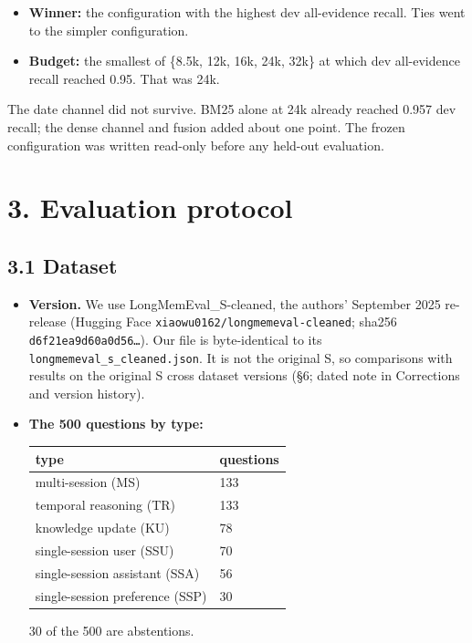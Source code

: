 \documentclass[11pt]{article}
\providecommand{\tightlist}{\setlength{\itemsep}{0pt}\setlength{\parskip}{0pt}}
\begin{document}
\begin{itemize}
\tightlist
\item
  \textbf{Winner:} the configuration with the highest dev all-evidence recall. Ties went to the simpler
  configuration.
\item
  \textbf{Budget:} the smallest of \{8.5k, 12k, 16k, 24k, 32k\} at which dev all-evidence recall reached 0.95.
  That was 24k.
\end{itemize}

The date channel did not survive. BM25 alone at 24k already reached 0.957 dev recall; the dense channel and
fusion added about one point. The frozen configuration was written read-only before any held-out
evaluation.

\hypertarget{evaluation-protocol}{%
\section{3. Evaluation protocol}\label{evaluation-protocol}}

\hypertarget{dataset}{%
\subsection{3.1 Dataset}\label{dataset}}

\begin{itemize}
\item
  \textbf{Version.} We use LongMemEval\_S-cleaned, the authors' September 2025 re-release (Hugging Face
  \texttt{xiaowu0162/longmemeval-cleaned}; sha256 \texttt{d6f21ea9d60a0d56…}). Our file is byte-identical to its
  \texttt{longmemeval\_s\_cleaned.json}. It is not the original S, so comparisons with results on the original S
  cross dataset versions (§6; dated note in Corrections and version history).
\item
  \textbf{The 500 questions by type:}

  \begin{longtable}[]{@{}ll@{}}
  \toprule\noalign{}
  type & questions \\
  \midrule\noalign{}
  \endhead
  \bottomrule\noalign{}
  \endlastfoot
  multi-session (MS) & 133 \\
  temporal reasoning (TR) & 133 \\
  knowledge update (KU) & 78 \\
  single-session user (SSU) & 70 \\
  single-session assistant (SSA) & 56 \\
  single-session preference (SSP) & 30 \\
  \end{longtable}

  30 of the 500 are abstentions.
\end{itemize}
\end{document}
